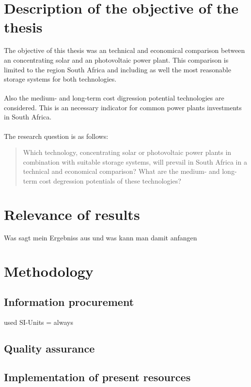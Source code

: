 \documentclass[Master,MEE,english]{twbook}%
\begin{document}
\section{Description of the objective of the thesis}
The objective of this thesis was an technical and economical comparison between an concentrating solar and an photovoltaic power plant. This comparison is limited to the region South Africa and including as well the most reasonable storage systems for both technologies. \\
\\
Also the medium- and long-term cost digression potential technologies are considered. This is an necessary indicator for common power plants investments in South Africa.\\
\\
The research question is as follows:
\begin{quote}
Which technology, concentrating solar or photovoltaic power plants in combination with suitable storage systems, will prevail in South Africa in a technical and economical comparison? What are the medium- and long-term cost degression potentials of these technologies?
\end{quote}


\section{Relevance of results}
Was sagt mein Ergebniss aus und was kann man damit anfangen
\section{Methodology}

\subsection{Information procurement}
used SI-Units  = always 
\subsection{Quality assurance}

\subsection{Implementation of present resources}

\pagebreak

\end{document}
